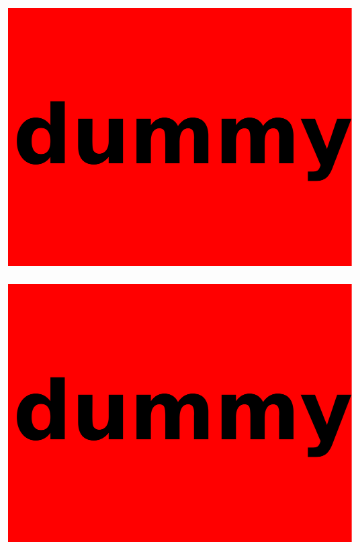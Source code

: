 \begin{figure}
\centering
\begin{subfigure}[]{0.49\textwidth}
	\includegraphics[width=\textwidth]{images/dummy.pdf}
\end{subfigure}
\hfill
\begin{subfigure}[]{0.49\textwidth}
	\includegraphics[width=\textwidth]{images/dummy.pdf}
\end{subfigure}


\end{figure}
